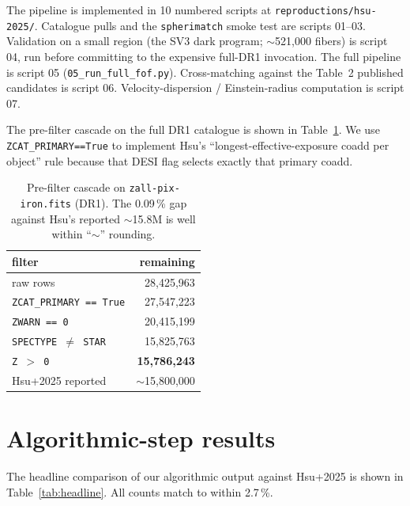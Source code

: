 \documentclass[11pt,letterpaper]{article}
\begin{document}
The pipeline is implemented in 10 numbered scripts at
\texttt{reproductions/hsu-2025/}. Catalogue pulls and the \texttt{spherimatch}
smoke test are scripts 01--03. Validation on a small region (the SV3 dark
program; $\sim$521{,}000 fibers) is script 04, run before committing to
the expensive full-DR1 invocation. The full pipeline is script 05
(\texttt{05\_run\_full\_fof.py}). Cross-matching against the
\citet{hsu2025pairwise} Table~2 published candidates is script 06.
Velocity-dispersion / Einstein-radius computation is script 07.

The pre-filter cascade on the full DR1 catalogue is shown in
Table~\ref{tab:prefilter}. We use \texttt{ZCAT\_PRIMARY==True} to
implement Hsu's ``longest-effective-exposure coadd per object'' rule
because that DESI flag selects exactly that primary coadd.

\begin{table}[ht]
\centering
\caption{Pre-filter cascade on \texttt{zall-pix-iron.fits} (DR1).
The 0.09\,\% gap against Hsu's reported $\sim$15.8M is well within
``$\sim$'' rounding.}
\label{tab:prefilter}
\begin{tabular}{lr}
\toprule
filter                                     & remaining \\
\midrule
raw rows                                   & 28{,}425{,}963 \\
\texttt{ZCAT\_PRIMARY == True}             & 27{,}547{,}223 \\
\texttt{ZWARN == 0}                        & 20{,}415{,}199 \\
\texttt{SPECTYPE $\neq$ STAR}              & 15{,}825{,}763 \\
\texttt{Z $>$ 0}                           & \textbf{15{,}786{,}243} \\
\midrule
Hsu+2025 reported                          & $\sim$15{,}800{,}000 \\
\bottomrule
\end{tabular}
\end{table}

\section{Algorithmic-step results}

The headline comparison of our algorithmic output against Hsu+2025 is
shown in Table~\ref{tab:headline}. All counts match to within 2.7\,\%.
\end{document}
